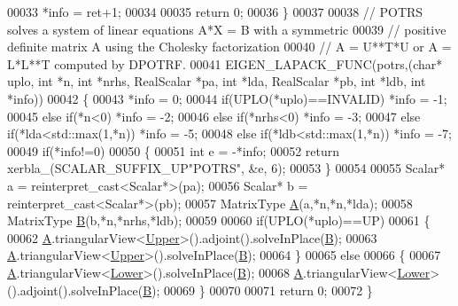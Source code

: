 \begin{DoxyCode}
00033     *info = ret+1;
00034   
00035   \textcolor{keywordflow}{return} 0;
00036 \}
00037 
00038 \textcolor{comment}{// POTRS solves a system of linear equations A*X = B with a symmetric}
00039 \textcolor{comment}{// positive definite matrix A using the Cholesky factorization}
00040 \textcolor{comment}{// A = U**T*U or A = L*L**T computed by DPOTRF.}
00041 EIGEN\_LAPACK\_FUNC(potrs,(\textcolor{keywordtype}{char}* uplo, \textcolor{keywordtype}{int} *n, \textcolor{keywordtype}{int} *nrhs, RealScalar *pa, \textcolor{keywordtype}{int} *lda, RealScalar *pb, \textcolor{keywordtype}{int} *ldb,
       \textcolor{keywordtype}{int} *info))
00042 \{
00043   *info = 0;
00044         \textcolor{keywordflow}{if}(UPLO(*uplo)==INVALID) *info = -1;
00045   \textcolor{keywordflow}{else}  \textcolor{keywordflow}{if}(*n<0)                 *info = -2;
00046   \textcolor{keywordflow}{else}  \textcolor{keywordflow}{if}(*nrhs<0)              *info = -3;
00047   \textcolor{keywordflow}{else}  \textcolor{keywordflow}{if}(*lda<std::max(1,*n))  *info = -5;
00048   \textcolor{keywordflow}{else}  \textcolor{keywordflow}{if}(*ldb<std::max(1,*n))  *info = -7;
00049   \textcolor{keywordflow}{if}(*info!=0)
00050   \{
00051     \textcolor{keywordtype}{int} e = -*info;
00052     \textcolor{keywordflow}{return} xerbla\_(SCALAR\_SUFFIX\_UP\textcolor{stringliteral}{"POTRS"}, &e, 6);
00053   \}
00054 
00055   Scalar* a = \textcolor{keyword}{reinterpret\_cast<}Scalar*\textcolor{keyword}{>}(pa);
00056   Scalar* b = \textcolor{keyword}{reinterpret\_cast<}Scalar*\textcolor{keyword}{>}(pb);
00057   MatrixType \hyperlink{group___core___module_class_eigen_1_1_matrix}{A}(a,*n,*n,*lda);
00058   MatrixType \hyperlink{group___core___module_class_eigen_1_1_matrix}{B}(b,*n,*nrhs,*ldb);
00059 
00060   \textcolor{keywordflow}{if}(UPLO(*uplo)==UP)
00061   \{
00062     \hyperlink{group___core___module_class_eigen_1_1_matrix}{A}.triangularView<\hyperlink{group__enums_gga39e3366ff5554d731e7dc8bb642f83cda6bcb58be3b8b8ec84859ce0c5ac0aaec}{Upper}>().adjoint().solveInPlace(\hyperlink{group___core___module_class_eigen_1_1_matrix}{B});
00063     \hyperlink{group___core___module_class_eigen_1_1_matrix}{A}.triangularView<\hyperlink{group__enums_gga39e3366ff5554d731e7dc8bb642f83cda6bcb58be3b8b8ec84859ce0c5ac0aaec}{Upper}>().solveInPlace(\hyperlink{group___core___module_class_eigen_1_1_matrix}{B});
00064   \}
00065   \textcolor{keywordflow}{else}
00066   \{
00067     \hyperlink{group___core___module_class_eigen_1_1_matrix}{A}.triangularView<\hyperlink{group__enums_gga39e3366ff5554d731e7dc8bb642f83cda891792b8ed394f7607ab16dd716f60e6}{Lower}>().solveInPlace(\hyperlink{group___core___module_class_eigen_1_1_matrix}{B});
00068     \hyperlink{group___core___module_class_eigen_1_1_matrix}{A}.triangularView<\hyperlink{group__enums_gga39e3366ff5554d731e7dc8bb642f83cda891792b8ed394f7607ab16dd716f60e6}{Lower}>().adjoint().solveInPlace(\hyperlink{group___core___module_class_eigen_1_1_matrix}{B});
00069   \}
00070 
00071   \textcolor{keywordflow}{return} 0;
00072 \}
\end{DoxyCode}
